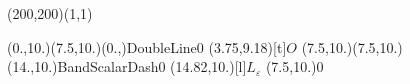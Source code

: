 \unitlength=1bp%

\begin{feynartspicture}(200,200)(1,1)

\FADiagram{}
\FAProp(0.,10.)(7.5,10.)(0.,){DoubleLine}{0}
\FALabel(3.75,9.18)[t]{$O$}
\FAProp(7.5,10.)(7.5,10.)(14.,10.){BandScalarDash}{0}
\FALabel(14.82,10.)[l]{$L_\varepsilon$}
\FAVert(7.5,10.){0}
\end{feynartspicture}

